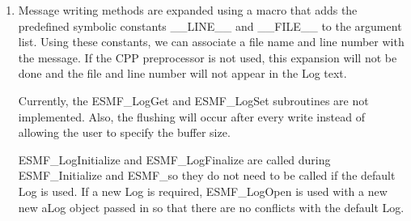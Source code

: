 %


\begin{enumerate}

\item Message writing methods are expanded using a macro that adds the
predefined symbolic constants \_\_LINE\_\_ and \_\_FILE\_\_ to the argument list.
Using these constants, we can associate a file name and line number with the
message.  If the CPP preprocessor is not used, this expansion will not be done
and the file and line number will not appear in the Log text.

Currently, the ESMF\_LogGet and ESMF_LogSet subroutines are not implemented.
Also, the flushing will occur after every write instead of allowing the user to
specify the buffer size.

ESMF\_LogInitialize and ESMF\_LogFinalize are called during ESMF\_Initialize and
ESMF_\Finalize so they do not need to be called if the default Log is used.  If
a new Log is required, ESMF\_LogOpen is used with a new new aLog object passed
in so that there are no conflicts with the default Log.

\end{enumerate}
